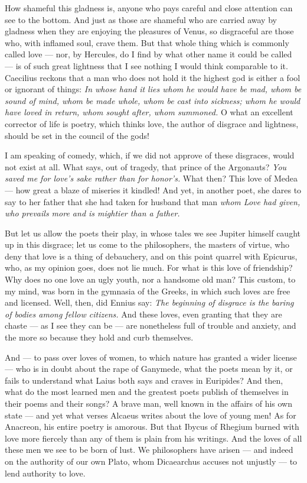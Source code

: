  How shameful this gladness is, anyone who pays careful and close attention can see to the bottom. And just as those are shameful who are carried away by gladness when they are enjoying the pleasures of Venus, so disgraceful are those who, with inflamed soul, crave them. But that whole thing which is commonly called love — nor, by Hercules, do I find by what other name it could be called — is of such great lightness that I see nothing I would think comparable to it. Caecilius reckons that a man who does not hold it the highest god is either a fool or ignorant of things: \textit{In whose hand it lies whom he would have be mad, whom be sound of mind, whom be made whole, whom be cast into sickness; whom he would have loved in return, whom sought after, whom summoned.} O what an excellent corrector of life is poetry, which thinks love, the author of disgrace and lightness, should be set in the council of the gods!

 I am speaking of comedy, which, if we did not approve of these disgraces, would not exist at all. What says, out of tragedy, that prince of the Argonauts? \textit{You saved me for love's sake rather than for honor's.} What then? This love of Medea — how great a blaze of miseries it kindled! And yet, in another poet, she dares to say to her father that she had taken for husband that man \textit{whom Love had given, who prevails more and is mightier than a father.}

 But let us allow the poets their play, in whose tales we see Jupiter himself caught up in this disgrace; let us come to the philosophers, the masters of virtue, who deny that love is a thing of debauchery, and on this point quarrel with Epicurus, who, as my opinion goes, does not lie much. For what is this love of friendship? Why does no one love an ugly youth, nor a handsome old man? This custom, to my mind, was born in the gymnasia of the Greeks, in which such loves are free and licensed. Well, then, did Ennius say: \textit{The beginning of disgrace is the baring of bodies among fellow citizens.} And these loves, even granting that they are chaste — as I see they can be — are nonetheless full of trouble and anxiety, and the more so because they hold and curb themselves.

 And — to pass over loves of women, to which nature has granted a wider license — who is in doubt about the rape of Ganymede, what the poets mean by it, or fails to understand what Laius both says and craves in Euripides? And then, what do the most learned men and the greatest poets publish of themselves in their poems and their songs? A brave man, well known in the affairs of his own state — and yet what verses Alcaeus writes about the love of young men! As for Anacreon, his entire poetry is amorous. But that Ibycus of Rhegium burned with love more fiercely than any of them is plain from his writings. And the loves of all these men we see to be born of lust. We philosophers have arisen — and indeed on the authority of our own Plato, whom Dicaearchus accuses not unjustly — to lend authority to love.

